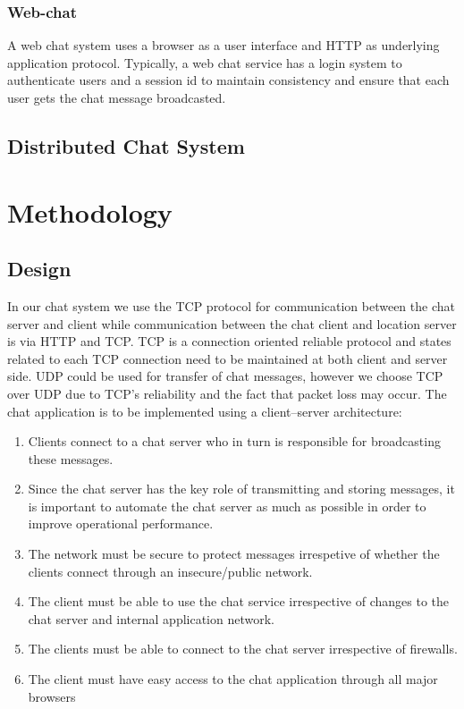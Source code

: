 \subsubsection{Web-chat}
A web chat system uses a browser as a user interface and HTTP as underlying application protocol. Typically, a web chat service has a login system to authenticate users and a session id to maintain consistency and ensure that each user gets the chat message broadcasted.
\subsection{Distributed Chat System}

\section{Methodology}
\subsection{Design}
In our chat system we use the TCP protocol for communication between the chat server and client while communication between the chat client and location server is via HTTP and TCP. TCP is a connection oriented reliable protocol and states related to each TCP connection need to be maintained at both client and server side. UDP could be used for transfer of chat messages, however we choose TCP over UDP due to TCP's reliability and the fact that packet loss may occur. 
The chat application is to be implemented using a client–server architecture:
\begin{enumerate}
\item Clients connect to a chat server who in turn is responsible for broadcasting these messages.
\item Since the chat server has the key role of transmitting and storing
messages, it is important to automate the chat server as much as possible in
order to improve operational performance.
\item The network must be secure to protect messages irrespetive of whether the
clients connect through an insecure/public network.
\item The client must be able to use the chat service irrespective of changes to
the chat server and internal application network.
\item The clients must be able to connect to the chat server irrespective of
firewalls.
\item The client must have easy access to the chat application through all major
browsers
\end{enumerate}

